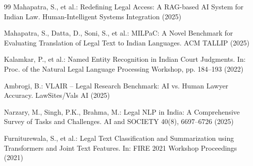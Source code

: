 \documentclass{llncs}
\begin{document}
\begin{thebibliography}{99}
Mahapatra, S., et al.: Redefining Legal Access: A RAG-based AI System for Indian Law. Human-Intelligent Systems Integration (2025)

Mahapatra, S., Datta, D., Soni, S., et al.: MILPaC: A Novel Benchmark for Evaluating Translation of Legal Text to Indian Languages. ACM TALLIP (2025)

Kalamkar, P., et al.: Named Entity Recognition in Indian Court Judgments. In: Proc. of the Natural Legal Language Processing Workshop, pp. 184--193 (2022)

Ambrogi, B.: VLAIR – Legal Research Benchmark: AI vs. Human Lawyer Accuracy. LawSites/Vals AI (2025)

Narzary, M., Singh, P.K., Brahma, M.: Legal NLP in India: A Comprehensive Survey of Tasks and Challenges. AI and SOCIETY 40(8), 6697--6726 (2025)

Furniturewala, S., et al.: Legal Text Classification and Summarization using Transformers and Joint Text Features. In: FIRE 2021 Workshop Proceedings (2021)

\end{thebibliography}
\end{document}

